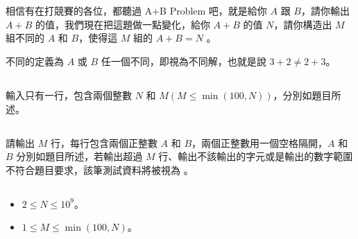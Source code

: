 



\section*{}

\subsection*{}

相信有在打競賽的各位，都聽過 A+B Problem 吧，就是給你 $A$ 跟 $B$，請你輸出 $A + B$ 的值，我們現在把這題做一點變化，給你 $A + B$ 的值 $N$，請你構造出 $M$ 組不同的 $A$ 和 $B$，使得這 $M$ 組的 $A+B=N$ 。

不同的定義為 $A$ 或 $B$ 任一個不同，即視為不同解，也就是說 $3 + 2 \ne 2 + 3$。


\subsection*{}

輸入只有一行，包含兩個整數 $N$ 和 $M(M \le \min(100, N))$，分別如題目所述。

\subsection*{}

請輸出 $M$ 行，每行包含兩個正整數 $A$ 和 $B$，兩個正整數用一個空格隔開，$A$ 和 $B$ 分別如題目所述，若輸出超過 $M$ 行、輸出不該輸出的字元或是輸出的數字範圍不符合題目要求，該筆測試資料將被視為 。

\subsection*{}

\begin{itemize}
    \item $2\le N \le 10^9$。
    \item $1\le M \le \min(100, N)$。
\end{itemize}

\subsection*{}

